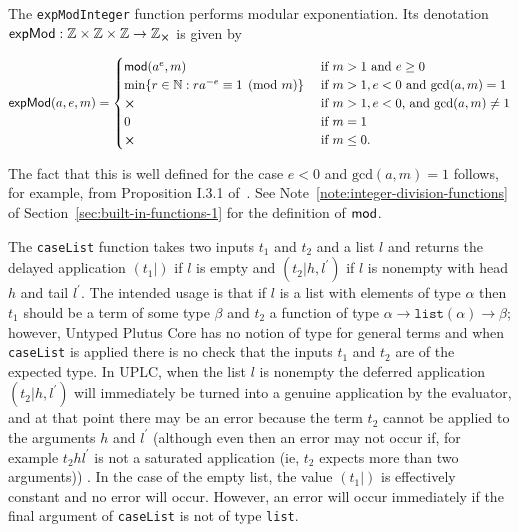\label{note:exp-mod-integer}
The \texttt{expModInteger} function performs modular exponentiation.  Its denotation
$\mathsf{expMod}: \Z \times \Z \times \Z \rightarrow \Z_{\errorX}$ is given by

$$
\mathsf{expMod}(a,e,m) =
  \begin{cases}
     \modfn(a^e,m) & \text{if $m > 1$ and $e \geq 0$}\\
     \min\{r \in \N: ra^{-e} \equiv 1\pmod{m}\}\  & \text{if $m > 1, e < 0$ and $\mathrm{gcd}(a,m) = 1$}\\
     \errorX & \text{if $m>1,e<0$, and $\mathrm{gcd}(a,m) \neq 1$}\\
     0 & \text{if $m=1$}\\
     \errorX & \text{if $m \leq 0$.}
  \end{cases}
$$ 

\noindent The fact that this is well defined for the case $e<0$ and $\mathrm{gcd}(a,m) = 1$
follows, for example, from Proposition I.3.1 of~\cite{Koblitz-GTM}.  See
Note~\ref{note:integer-division-functions} of
Section~\ref{sec:built-in-functions-1} for the definition of $\operatorname{\mathsf{mod}}$.

\label{note:case-list-case-data}
The \texttt{caseList} function takes two inputs $t_1$ and $t_2$ and a list $l$
and returns the delayed application $(t_1|)$ if $l$ is empty and
$(t_2|h,l^{\prime})$ if $l$ is nonempty with head $h$ and tail $l^{\prime}$.
The intended usage is that if $l$ is a list with elements of type $\alpha$ then
$t_1$ should be a term of some type $\beta$ and $t_2$ a function of type
$\alpha \rightarrow
\mathtt{list}(\alpha) \rightarrow \beta$; however, Untyped Plutus Core has no notion
of type for general terms and when \texttt{caseList} is applied there is no
check that the inputs $t_1$ and $t_2$ are of the expected type.  In UPLC, when
the list $l$ is nonempty the deferred application $(t_2|h,l^{\prime})$ will
immediately be turned into a genuine application by the evaluator, and at that
point there may be an error because the term $t_2$ cannot be applied to the
arguments $h$ and $l^{\prime}$ (although even then an error may not occur if,
for example $t_2 h l^{\prime}$ is not a saturated application (ie, $t_2$ expects
more than two arguments)) .  In the case of the empty list, the value $(t_1|)$
is effectively constant and no error will occur.  However, an error will occur
immediately if the final argument of \texttt{caseList} is not of
type \texttt{list}.

